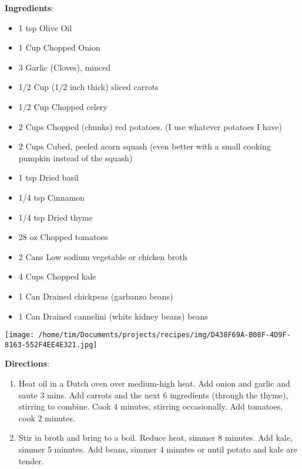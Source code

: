 \documentclass[11pt, twoside, openany]{book}
\begin{document}
\begin{minipage}[t]{0.8\linewidth}
\textbf{Ingredients}:\vspace{-3mm}
\begin{multicols}{2}
\begin{itemize}\setlength\itemsep{-1mm}
\item 1 tsp Olive Oil
\item 1 Cup Chopped Onion
\item 3 Garlic (Cloves), minced
\item 1/2 Cup (1/2 inch thick) sliced carrots
\item 1/2 Cup Chopped celery
\item 2 Cups Chopped (chunks) red potatoes. (I use whatever potatoes I have)
\item 2 Cups Cubed, peeled acorn squash (even better with a small cooking pumpkin instead of the squash)
\item 1 tsp Dried basil
\item 1/4 tsp Cinnamon
\item 1/4 tsp Dried thyme
\item 28 oz Chopped tomatoes
\item 2 Cans Low sodium vegetable or chicken broth
\item 4 Cups Chopped kale
\item 1 Can Drained chickpeas (garbanzo beans)
\item 1 Can Drained cannelini (white kidney beans) beans
\end{itemize}
\end{multicols}
\end{minipage}
\begin{minipage}[t]{0.2\linewidth}
\centering \strut\vspace*{-\baselineskip}\newline
\texttt{[image: /home/tim/Documents/projects/recipes/img/D438F69A-B08F-4D9F-8163-552F4EE4E321.jpg]}\\
\end{minipage}\vspace{3mm}
\textbf{Directions}:
\vspace{-3mm}\begin{enumerate}\setlength\itemsep{-1mm}
\item Heat oil in a Dutch oven over medium-high heat. Add onion and garlic and saute 3 mins. Add carrots and the next 6 ingredients (through the thyme), stirring to combine. Cook 4 minutes, stirring occasionally. Add tomatoes, cook 2 minutes.
\item Stir in broth and bring to a boil. Reduce heat, simmer 8 minutes. Add kale, simmer 5 minutes. Add beans, simmer 4 minutes or until potato and kale are tender. 
\end{enumerate}
\end{document}
